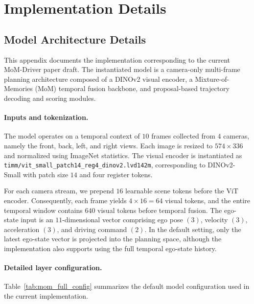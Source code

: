 \section{Implementation Details}

\subsection{Model Architecture Details}

This appendix documents the implementation corresponding to the current MoM-Driver paper draft. The instantiated model is a camera-only multi-frame planning architecture composed of a DINOv2 visual encoder, a Mixture-of-Memories (MoM) temporal fusion backbone, and proposal-based trajectory decoding and scoring modules.

\paragraph{Inputs and tokenization.}
The model operates on a temporal context of $10$ frames collected from $4$ cameras, namely the front, back, left, and right views. Each image is resized to $574 \times 336$ and normalized using ImageNet statistics. The visual encoder is instantiated as \texttt{timm/vit\_small\_patch14\_reg4\_dinov2.lvd142m}, corresponding to DINOv2-Small with patch size $14$ and four register tokens.

For each camera stream, we prepend $16$ learnable scene tokens before the ViT encoder. Consequently, each frame yields $4 \times 16 = 64$ visual tokens, and the entire temporal window contains $640$ visual tokens before temporal fusion. The ego-state input is an $11$-dimensional vector comprising ego pose $(3)$, velocity $(3)$, acceleration $(3)$, and driving command $(2)$. In the default setting, only the latest ego-state vector is projected into the planning space, although the implementation also supports using the full temporal ego-state history.

\paragraph{Detailed layer configuration.}
Table~\ref{tab:mom_full_config} summarizes the default model configuration used in the current implementation.


